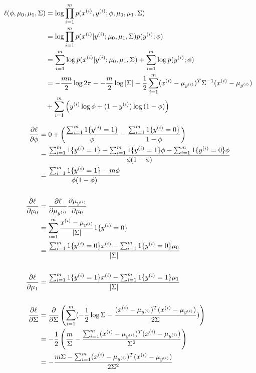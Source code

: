 \begin{answer}
    $$
    \begin{aligned}
        \ell(\phi, \mu_{0}, \mu_1, \Sigma) 
        &= \log \prod_{i=1}^m p(x^{(i)} , y^{(i)};\phi, \mu_{0}, \mu_1, \Sigma) \\
        &= \log \prod_{i=1}^m p(x^{(i)} | y^{(i)}; \mu_{0}, \mu_1, \Sigma) p(y^{(i)};\phi)\\
        &=\sum_{i = 1}^m \log{p(x^{(i)} | y^{(i)}; \mu_{0}, \mu_1, \Sigma)} + \sum_{i = 1}^m \log p(y^{(i)};\phi) \\
        &=-\frac{mn}{2}\log{2\pi}--\frac{m}{2}\log{|\Sigma|}-
        \frac{1}{2}\sum_{i=1}^m(x^{(i)}-\mu_{y^{(i)}})^T\Sigma^{-1}(x^{(i)}-\mu_{y^{(i)}})\\
        &+\sum_{i=1}^m \left(y^{(i)}\log{\phi}+(1-y^{(i)})\log{(1-\phi)}\right)
    \end{aligned}\\
    $$

    $$
    \begin{aligned}
        \frac{\partial\ell}{\partial \phi} &=0+\left(\frac{\sum_{i = 1}^m 1\{y^{(i)}=1\}}{\phi}-\frac{\sum_{i = 1}^m 1\{y^{(i)}=0\}}{1-\phi}\right)\\
        &=\frac{\sum_{i = 1}^m 1\{y^{(i)}=1\}-\sum_{i = 1}^m 1\{y^{(i)}=1\}\phi-\sum_{i = 1}^m 1\{y^{(i)}=0\}\phi}{\phi(1-\phi)} \\
        &=\frac{\sum_{i = 1}^m 1\{y^{(i)}=1\}-m\phi}{\phi(1-\phi)}\\
        \ \\
        \frac{\partial\ell}{\partial \mu_0} &= \frac{\partial\ell}{\partial \mu_{y^{(i)}}}\frac{\partial\mu_{y^{(i)}}}{\partial \mu_0} \\
        &=\sum_{i = 1}^m\frac{x^{(i)}-\mu_{y^{(i)}}}{|\Sigma|}1\{y^{(i)}=0\}\\
        &=\frac{\sum_{i = 1}^m1\{y^{(i)}=0\}x^{(i)}-\sum_{i = 1}^m1\{y^{(i)}=0\}\mu_0}{|\Sigma|}\\
        \ \\
        \frac{\partial\ell}{\partial \mu_1} &=\frac{\sum_{i = 1}^m1\{y^{(i)}=1\}x^{(i)}-\sum_{i = 1}^m1\{y^{(i)}=1\}\mu_1}{|\Sigma|}\\
        \ \\
        \frac{\partial \ell}{\partial\Sigma} &= \frac{\partial}{\partial \Sigma}\left(\sum_{i = 1}^m(-\frac{1}{2}\log{\Sigma-\frac{(x^{(i)}-\mu_{y^{(i)}})^T(x^{(i)}-\mu_{y^{(i)}})}{2\Sigma}}) \right) \\
        &=-\frac{1}{2}\left(\frac{m}{\Sigma}-\frac{\sum_{i = 1}^m(x^{(i)}-\mu_{y^{(i)}})^T(x^{(i)}-\mu_{y^{(i)}})}{\Sigma^2} \right) \\
        &=-\frac{m\Sigma-\sum_{i = 1}^m(x^{(i)}-\mu_{y^{(i)}})^T(x^{(i)}-\mu_{y^{(i)}})}{2\Sigma^2}\\
    \end{aligned}  \\
    $$
    

\end{answer}
